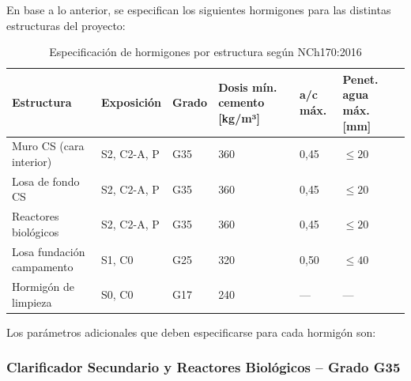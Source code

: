 \noindent En base a lo anterior, se especifican los siguientes hormigones para las distintas estructuras del proyecto:

\begin{table}[H]
  \centering
  \caption{Especificación de hormigones por estructura según NCh170:2016}
  \label{tab:hormigones}
  \begin{tabular}{p{3.5cm} p{2.2cm} p{1.5cm} p{2.2cm} p{2.2cm} p{2.5cm}}
    \toprule
    \textbf{Estructura}         & \textbf{Exposición} & \textbf{Grado} & \textbf{Dosis mín. cemento [kg/m³]} & \textbf{a/c máx.} & \textbf{Penet. agua máx. [mm]} \\
    \midrule
    Muro CS (cara interior)     & S2, C2-A, P         & G35            & 360                                  & 0{,}45            & $\leq 20$ \\
    Losa de fondo CS            & S2, C2-A, P         & G35            & 360                                  & 0{,}45            & $\leq 20$ \\
    Reactores biológicos        & S2, C2-A, P         & G35            & 360                                  & 0{,}45            & $\leq 20$ \\
    Losa fundación campamento   & S1, C0              & G25            & 320                                  & 0{,}50            & $\leq 40$ \\
    Hormigón de limpieza        & S0, C0              & G17            & 240                                  & ---               & ---       \\
    \bottomrule
  \end{tabular}
\end{table}

\noindent Los parámetros adicionales que deben especificarse para cada hormigón son:

\subsubsection{Clarificador Secundario y Reactores Biológicos -- Grado G35}

